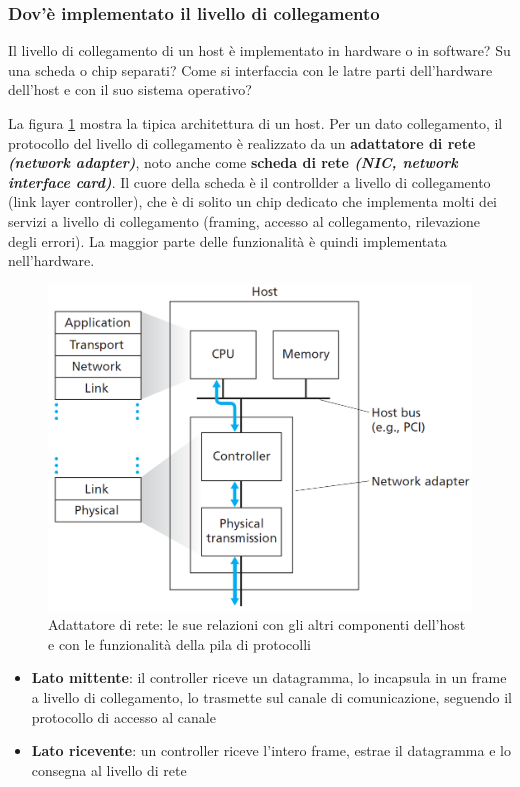 \documentclass[11pt,a4paper]{article}
\begin{document}
\subsubsection{Dov'è implementato il livello di collegamento}
Il livello di collegamento di un host è implementato in hardware o in software? Su una scheda o chip separati? Come si interfaccia con le latre parti dell'hardware dell'host e con il suo sistema operativo?

La figura \ref{fig: 069} mostra la tipica architettura di un host. Per un dato collegamento, il protocollo del livello di collegamento è realizzato da un \textbf{adattatore di rete \textit{(network adapter)}}, noto anche come \textbf{scheda di rete \textit{(NIC, network interface card)}}. Il cuore della scheda è il controllder a livello di collegamento (link layer controller), che è di solito un chip dedicato che implementa molti dei servizi a livello di collegamento (framing, accesso al collegamento, rilevazione degli errori). La maggior parte delle funzionalità è quindi implementata nell'hardware.
\begin{figure}
	\begin{center}
		\includegraphics[scale=1]{img/069.png}
		\caption{Adattatore di rete: le sue relazioni con gli altri componenti dell'host e con le funzionalità della pila di protocolli}
		\label{fig: 069}
	\end{center}
\end{figure}
\begin{itemize}
	\item \textbf{Lato mittente}: il controller riceve un datagramma, lo incapsula in un frame a livello di collegamento, lo trasmette sul canale di comunicazione, seguendo il protocollo di accesso al canale
	\item \textbf{Lato ricevente}: un controller riceve l'intero frame, estrae il datagramma e lo consegna al livello di rete
\end{itemize}
\end{document}
